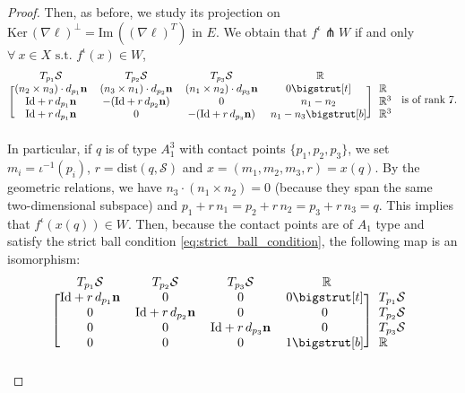 \documentclass[11pt]{article}
\newcommand{\R}{\mathbb{R}}
\newcommand{\io}{\iota}
\newcommand{\nbf}{\mathbf{n}}
\newcommand{\dist}{\mathrm{dist}}
\newcommand{\Surf}{\mathcal{S}}
\newcommand{\grad}{\nabla}
\newcommand{\Id}{\mathrm{Id}}
\newcommand{\Ker}{\mathrm{Ker} \,}
\renewcommand{\Im}{\mathrm{Im} \,}
\newcommand\topstrut[1][1.2ex]{\setlength\bigstrutjot{#1}{\bigstrut[t]}}
\newcommand\botstrut[1][1.2ex]{\setlength\bigstrutjot{#1}{\bigstrut[b]}}
\theoremstyle{plain}
\theoremstyle{definition}
\theoremstyle{remark}
\begin{document}
\begin{proof}
		Then,
		as before, we study its projection on $\Ker(\grad \ell)^\perp = \Im((\grad \ell)^T)$ in $E$. We obtain that $f^\io \pitchfork W$ if and only $\forall\ x \in X \text{ s.t. } f^\io(x) \in W$,
		\begin{equation*}
			\begin{blockarray}{ccccl}
				\begin{block}{ccccl}
					T_{p_1} \Surf & T_{p_2} \Surf & T_{p_3} \Surf & ~~\R~~ & \\
				\end{block}
				\begin{block}{[cccc] l}
					(n_2 \times n_3) \cdot d_{p_1} \nbf & (n_3 \times n_1) \cdot d_{p_2} \nbf & (n_1 \times n_2) \cdot d_{p_3} \nbf & 0 \topstrut  & \R \\
					\Id + r \, d_{p_1} \nbf & - (\Id + r \, d_{p_2} \nbf) & 0 & n_1 - n_2 & \R^3 \\
					\Id + r \, d_{p_1} \nbf & 0 & - (\Id + r \, d_{p_3} \nbf) & n_1 - n_3 \botstrut & \R^3 \\
				\end{block}
			\end{blockarray}
			\text{ is of rank } 7.
		\end{equation*}
		In particular, if $q$ is of type $A_1^3$ with contact points $\{p_1,p_2,p_3\}$, we set $m_i = \io^{-1}(p_i)$, $r = \dist(q, \Surf)$ and $x = (m_1,m_2,m_3,r) = x(q)$. By the geometric relations, we have $n_3 \cdot (n_1 \times n_2) = 0$ (because they span the same two-dimensional subspace) and $p_1 + r \, n_1 = p_2 + r \, n_2 = p_3 + r \, n_3 = q$.
		This implies that $f^\io(x(q)) \in W$. Then, because the contact points are of $A_1$ type and satisfy the strict ball condition \eqref{eq:strict_ball_condition}, the following map is an isomorphism:
		\begin{equation*}
			\begin{blockarray}{ccccl}
				\begin{block}{ccccl}
					T_{p_1} \Surf & T_{p_2} \Surf & T_{p_3} \Surf & ~~\R~~ & \\
				\end{block}
				\begin{block}{[cccc] l}
					\Id + r \, d_{p_1} \nbf & 0 & 0 & 0 \topstrut & T_{p_1} \Surf \\
					0 & \Id + r \, d_{p_2} \nbf & 0 & 0 & T_{p_2} \Surf \\
					0 & 0 & \Id + r \, d_{p_3} \nbf & 0 & T_{p_3} \Surf \\
					0 & 0 & 0 & 1 \botstrut & \R \\

\end{block}
\end{blockarray}
\end{equation*}
\end{proof}
\end{document}
